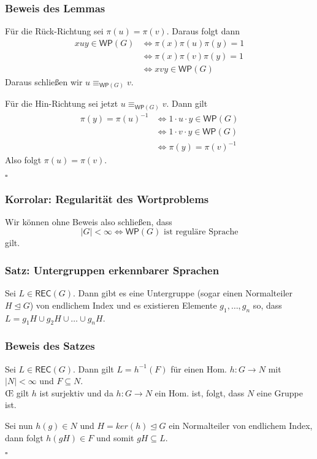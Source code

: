 \documentclass[12pt, german]{article}
\newcommand{\inv}{^{-1}}
\newcommand{\rec}{\mathsf{REC}}
\newcommand{\wop}{\mathsf{WP}}
\newcommand{\equivWP}{\equiv_{\mathsf{WP}(G)}}
\newcommand{\bewiesen}{
	
	\begin{flushright}
		$\square$  \\
\end{flushright}}
\begin{document}
	\subsubsection{Beweis des Lemmas}
	Für die Rück-Richtung sei $\pi(u) = \pi(v)$. Daraus folgt dann
	\begin{align*}
		xuy \in \wop(G) &\iff \pi(x)\pi(u)\pi(y) = 1  \\
		&\iff \pi(x)\pi(v)\pi(y) = 1 \\
		&\iff xvy \in \wop(G)
	\end{align*}
	Daraus schlie\ss en wir $u \equivWP v$.
	\newline
	
	Für die Hin-Richtung sei jetzt $u \equivWP v$. Dann gilt 
	\begin{align*}
		\pi(y) = \pi(u)\inv &\iff  1\cdot u \cdot y \in \wop(G)\\
		&\iff 1\cdot v \cdot y \in \wop(G)\\
		&\iff \pi(y) = \pi(v)\inv
	\end{align*}
	Also folgt $\pi(u) = \pi(v)$.
	\bewiesen
	
	\subsubsection{Korrolar: Regularität des Wortproblems}
	Wir können ohne Beweis also schlie\ss en, dass $$|G| < \infty \iff \wop(G) \text{ ist reguläre Sprache}$$ gilt.
	
	\subsubsection{Satz: Untergruppen erkennbarer Sprachen}
	Sei $L \in \rec(G)$. Dann gibt es eine Untergruppe (sogar einen Normalteiler $H \trianglelefteq G$) von endlichem Index und es existieren Elemente
	$g_1, \ldots, g_n$ so, dass $L = g_1H \cup g_2H \cup \ldots \cup g_nH$.   
	
	\subsubsection{Beweis des Satzes}
	Sei $L \in \rec(G)$. Dann gilt $L= h\inv(F)$ für einen Hom. $h:G \to N$ mit $|N| < \infty$ und $F \subseteq N$. \\
	
	\OE $\, \,$gilt $h$ ist surjektiv und da $h:G \to N$ ein Hom. ist, folgt, dass $N$  eine Gruppe ist. 
	
	Sei nun $h(g) \in N$ und $H= ker(h) \trianglelefteq G$ ein Normalteiler von endlichem Index, dann folgt $h(gH) \in F$ und somit $gH \subseteq L$.
	\bewiesen
	
\end{document}
